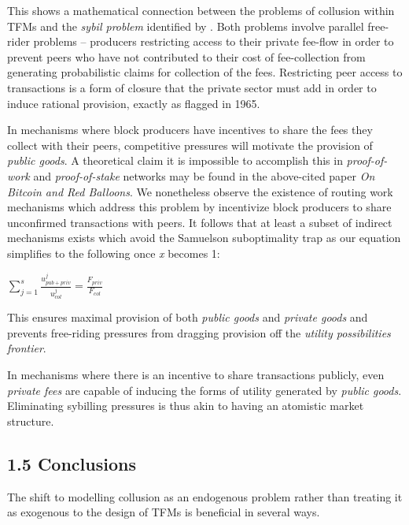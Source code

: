 \documentclass[oneside]{article}   	%
\begin{document}
This shows a mathematical connection between the problems of collusion within TFMs and the \textit{sybil problem} identified by \cite{babaioffredballoons}. Both problems involve parallel free-rider problems -- producers restricting access to their private fee-flow in order to prevent peers who have not contributed to their cost of fee-collection from generating probabilistic claims for collection of the fees. Restricting peer access to transactions is a form of closure that the private sector must add in order to induce rational provision, exactly as \cite{olson1971logic} flagged in 1965.

In mechanisms where block producers have incentives to share the fees they collect with their peers, competitive pressures will motivate the provision of \textit{public goods}. A theoretical claim it is impossible to accomplish this in \textit{proof-of-work} and \textit{proof-of-stake} networks may be found in the above-cited paper \textit{On Bitcoin and Red Balloons}. We nonetheless observe the existence of routing work mechanisms which address this problem by incentivize block producers to share unconfirmed transactions with peers. It follows that at least a subset of indirect mechanisms exists which avoid the Samuelson suboptimality trap as our equation simplifies to the following once \textit{x} becomes 1:

\LARGE
\begin{adjustwidth}{1.5em}{1.5em}
\begin{math}
\sum_{j=1}^{s} \frac{u_{{pub}+{priv}}^j}{u_{col}^j} = \frac{F_{{priv}}}{F_{col}}
\end{math}
\end{adjustwidth}
\normalsize

This ensures maximal provision of both \textit{public goods} and \textit{private goods} and prevents free-riding pressures from dragging provision off the \textit{utility possibilities frontier}.

In mechanisms where there is an incentive to share transactions publicly, even \textit{private fees} are capable of inducing the forms of utility generated by \textit{public goods}. Eliminating sybilling pressures is thus akin to having an atomistic market structure.

\subsection*{1.5 Conclusions}

The shift to modelling collusion as an endogenous problem rather than treating it as exogenous to the design of TFMs is beneficial in several ways.
\end{document}
